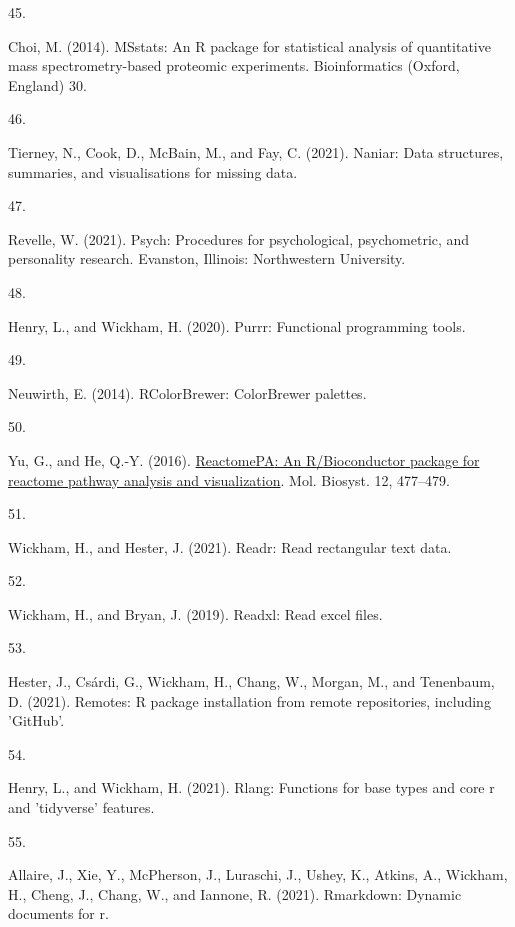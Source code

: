 \documentclass[
]{article}
\newlength{\cslhangindent}
\newlength{\csllabelwidth}
\newlength{\cslentryspacingunit} %
\newenvironment{CSLReferences}[2] %
 {%
  \setlength{\parindent}{0pt}
  \ifodd #1
  \let\oldpar\par
  \def\par{\hangindent=\cslhangindent\oldpar}
  \fi
  \setlength{\parskip}{#2\cslentryspacingunit}
 }%
 {}
\newcommand{\CSLLeftMargin}[1]{\parbox[t]{\csllabelwidth}{#1}}
\newcommand{\CSLRightInline}[1]{\parbox[t]{\linewidth - \csllabelwidth}{#1}\break}
\begin{document}
\begin{CSLReferences}{0}{0}
\leavevmode{}%
\CSLLeftMargin{45. }
\CSLRightInline{Choi, M. (2014). {MSstats}: An {R} package for statistical analysis of quantitative mass spectrometry-based proteomic experiments. Bioinformatics (Oxford, England) 30.}

\leavevmode{}%
\CSLLeftMargin{46. }
\CSLRightInline{Tierney, N., Cook, D., McBain, M., and Fay, C. (2021). Naniar: {Data} structures, summaries, and visualisations for missing data.}

\leavevmode{}%
\CSLLeftMargin{47. }
\CSLRightInline{Revelle, W. (2021). Psych: {Procedures} for psychological, psychometric, and personality research. {Evanston, Illinois}: {Northwestern University}.}

\leavevmode{}%
\CSLLeftMargin{48. }
\CSLRightInline{Henry, L., and Wickham, H. (2020). Purrr: {Functional} programming tools.}

\leavevmode{}%
\CSLLeftMargin{49. }
\CSLRightInline{Neuwirth, E. (2014). {RColorBrewer}: {ColorBrewer} palettes.}

\leavevmode{}%
\CSLLeftMargin{50. }
\CSLRightInline{Yu, G., and He, Q.-Y. (2016). \href{https://doi.org/10.1039/C5MB00663E}{{ReactomePA}: An {R}/{Bioconductor} package for reactome pathway analysis and visualization}. Mol. Biosyst. 12, 477--479.}

\leavevmode{}%
\CSLLeftMargin{51. }
\CSLRightInline{Wickham, H., and Hester, J. (2021). Readr: {Read} rectangular text data.}

\leavevmode{}%
\CSLLeftMargin{52. }
\CSLRightInline{Wickham, H., and Bryan, J. (2019). Readxl: {Read} excel files.}

\leavevmode{}%
\CSLLeftMargin{53. }
\CSLRightInline{Hester, J., Csárdi, G., Wickham, H., Chang, W., Morgan, M., and Tenenbaum, D. (2021). Remotes: {R} package installation from remote repositories, including '{GitHub}'.}

\leavevmode{}%
\CSLLeftMargin{54. }
\CSLRightInline{Henry, L., and Wickham, H. (2021). Rlang: {Functions} for base types and core r and 'tidyverse' features.}

\leavevmode{}%
\CSLLeftMargin{55. }
\CSLRightInline{Allaire, J., Xie, Y., McPherson, J., Luraschi, J., Ushey, K., Atkins, A., Wickham, H., Cheng, J., Chang, W., and Iannone, R. (2021). Rmarkdown: {Dynamic} documents for r.}


\end{CSLReferences}
\end{document}
